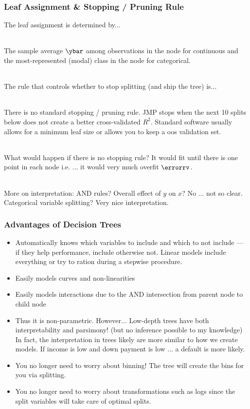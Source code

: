 \documentclass[handout]{beamer}
\begin{document}
\begin{frame}\frametitle{Leaf Assignment \& Stopping / Pruning Rule}
\small
The leaf assignment is determined by...\\~\\ \pause

The sample average $\ybar$ among observations in the node for continuous and the most-represented (modal) class in the node for categorical. \\~\\ \pause

The rule that controls whether to stop splitting (and ship the tree) is...\\~\\ \pause

There is no standard stopping / pruning rule. JMP stops when the next 10 splits below does not create a better cross-validated $R^2$. Standard software usually allows for a minimum leaf size or allows you to keep a oos validation set.\\~\\ \pause

What would happen if there is no stopping rule? \pause It would fit until there is one point in each node i.e. ... \pause it would very much overfit $\errorrv$. \\~\\ \pause

More on interpretation: AND rules? \pause Overall effect of $y$ on $x$? \pause No ... not so clear. Categorical variable splitting? \pause Very nice interpretation.

\end{frame}

\begin{frame}\frametitle{Advantages of Decision Trees}

\begin{itemize}
\item Automatically knows which variables to include and which to not include --- if they help performance, include otherwise not. Linear models include everything or try to ration during a stepwise procedure. \pause
\item Easily models curves and non-linearities \pause
\item Easily models interactions due to the AND intersection from parent node to child node \pause
\item Thus it is non-parametric. However... \pause Low-depth trees have both interpretability and parsimony! (but no inference possible to my knowledge) In fact, the interpretation in trees likely are more similar to how we create models. If income is low and down payment is low ... a default is more likely.\pause
\item You no longer need to worry about binning! The tree will create the bins for you via splitting.\pause
\item You no longer need to worry about transformations such as logs since the split variables will take care of optimal splits.
\end{itemize} 


	
\end{frame}
\end{document}
